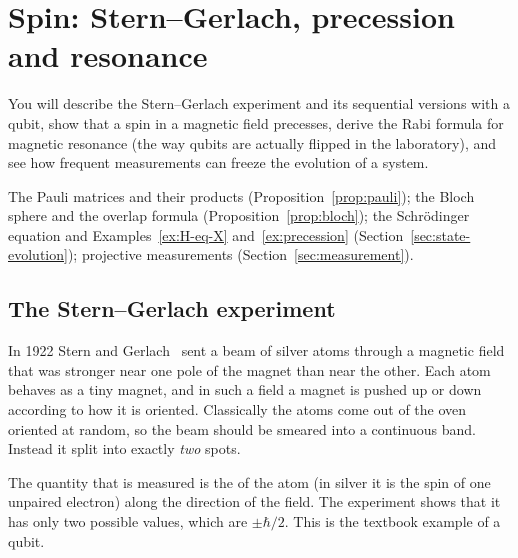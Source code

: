 \section{Spin: Stern--Gerlach, precession and resonance}\label{sec:spin}

\begin{objectives}
  You will describe the Stern--Gerlach experiment and its sequential versions with a qubit, show that a spin in a magnetic field precesses, derive the Rabi formula for magnetic resonance (the way qubits are actually flipped in the laboratory), and see how frequent measurements can freeze the evolution of a system.
\end{objectives}

\begin{recall}
  The Pauli matrices and their products (Proposition~\ref{prop:pauli}); the Bloch sphere and the overlap formula (Proposition~\ref{prop:bloch}); the Schr\"odinger equation and Examples~\ref{ex:H-eq-X} and~\ref{ex:precession} (Section~\ref{sec:state-evolution}); projective measurements (Section~\ref{sec:measurement}).
\end{recall}

\subsection{The Stern--Gerlach experiment}

In 1922 Stern and Gerlach~\cite{gerlach1922} sent a beam of silver atoms through a magnetic field that was stronger near one pole of the magnet than near the other. Each atom behaves as a tiny magnet, and in such a field a magnet is pushed up or down according to how it is oriented. Classically the atoms come out of the oven oriented at random, so the beam should be smeared into a continuous band. Instead it split into exactly \emph{two} spots.

The quantity that is measured is the  of the atom (in silver it is the spin of one unpaired electron) along the direction of the field. The experiment shows that it has only two possible values, which are $\pm\hbar/2$. This is the textbook example of a qubit.

